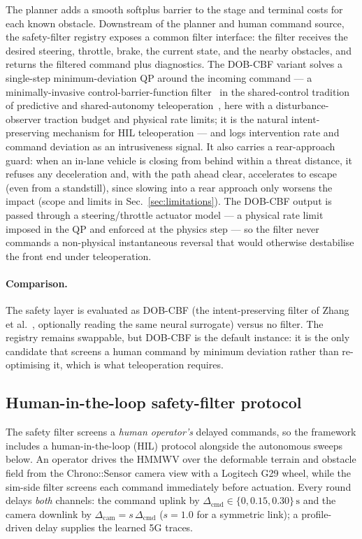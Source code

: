 \documentclass[conference,letterpaper,10pt]{IEEEtran}
\begin{document}
The planner adds a smooth softplus barrier to the stage and terminal
costs for each known obstacle. Downstream of the planner and human
command source, the safety-filter registry exposes a common filter
interface: the filter receives the desired steering, throttle, brake, the
current state, and the nearby obstacles, and returns the filtered command
plus diagnostics. The
DOB-CBF variant solves a single-step minimum-deviation QP around the
incoming command --- a minimally-invasive control-barrier-function
filter~\cite{Ames19} in the shared-control tradition of predictive and
shared-autonomy teleoperation~\cite{Hirche12,Dragan13}, here with a
disturbance-observer traction budget and physical rate limits; it is the
natural intent-preserving mechanism for HIL teleoperation --- and logs
intervention rate and command deviation as an intrusiveness signal. It also carries a rear-approach guard: when an
in-lane vehicle is closing from behind within a threat distance, it refuses
any deceleration and, with the path ahead clear, accelerates to escape (even
from a standstill), since slowing into a rear approach only worsens the impact
(scope and limits in Sec.~\ref{sec:limitations}). The DOB-CBF output
is passed through a steering/throttle actuator model --- a physical
rate limit imposed in the QP and enforced at the physics step --- so
the filter never commands a non-physical instantaneous reversal that
would otherwise destabilise the front end under teleoperation.

\paragraph{Comparison.}
The safety layer is evaluated as DOB-CBF (the intent-preserving filter
of Zhang et al.~\cite{Zhang25}, optionally reading the same neural
surrogate) versus no filter. The registry remains swappable, but
DOB-CBF is the default instance: it is the only candidate that screens
a human command by minimum deviation rather than re-optimising it, which
is what teleoperation requires.

\subsection{Human-in-the-loop safety-filter protocol}
\label{sec:safety_hil}

The safety filter screens a \emph{human operator's} delayed commands, so
the framework includes a human-in-the-loop (HIL) protocol alongside the
autonomous sweeps below. An operator drives the HMMWV over the
deformable terrain and obstacle field from the Chrono::Sensor camera view
with a Logitech G29 wheel, while the sim-side filter screens each command
immediately before actuation. Every round delays \emph{both} channels:
the command uplink by
$\Delta_\mathrm{cmd} \in \{0, 0.15, 0.30\}\,\mathrm{s}$ and the camera
downlink by $\Delta_\mathrm{cam} = s\,\Delta_\mathrm{cmd}$ ($s=1.0$ for a
symmetric link); a profile-driven delay supplies the learned 5G traces.
\end{document}
